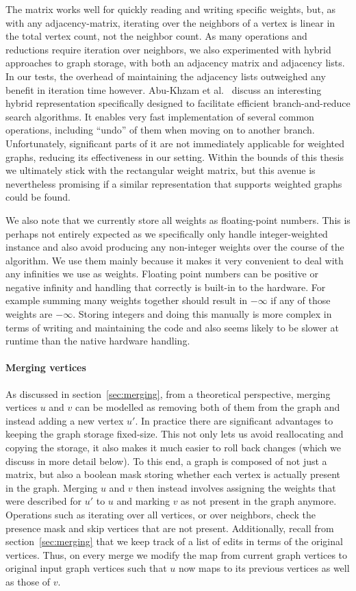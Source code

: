 \documentclass[12pt,oneside,english,parskip=full,headings=small]{scrbook}
\theoremstyle{definition}
\begin{document}
The matrix works well for quickly reading and writing specific weights, but, as with any
adjacency-matrix, iterating over the neighbors of a vertex is linear in the total vertex count, not
the neighbor count. As many operations and reductions require iteration over neighbors, we also
experimented with hybrid approaches to graph storage, with both an adjacency matrix and adjacency
lists. In our tests, the overhead of maintaining the adjacency lists outweighed any benefit in
iteration time however. Abu-Khzam et al.~\cite{AbuKhzam} discuss an interesting hybrid
representation specifically designed to facilitate efficient branch-and-reduce search algorithms. It
enables very fast implementation of several common operations, including ``undo'' of them when
moving on to another branch. Unfortunately, significant parts of it are not immediately applicable
for weighted graphs, reducing its effectiveness in our setting. Within the bounds of this thesis we
ultimately stick with the rectangular weight matrix, but this avenue is nevertheless promising if a
similar representation that supports weighted graphs could be found.

We also note that we currently store all weights as floating-point numbers. This is perhaps not
entirely expected as we specifically only handle integer-weighted instance and also avoid producing
any non-integer weights over the course of the algorithm. We use them mainly because it makes it
very convenient to deal with any infinities we use as weights. Floating point numbers can be
positive or negative infinity and handling that correctly is built-in to the hardware. For example
summing many weights together should result in $-\infty$ if any of those weights are $-\infty$.
Storing integers and doing this manually is more complex in terms of writing and maintaining the
code and also seems likely to be slower at runtime than the native hardware handling.

\paragraph{Merging vertices} As discussed in section~\ref{sec:merging}, from a theoretical
perspective, merging vertices $u$ and $v$ can be modelled as removing both of them from the graph
and instead adding a new vertex $u'$. In practice there are significant advantages to keeping the
graph storage fixed-size. This not only lets us avoid reallocating and copying the storage, it also
makes it much easier to roll back changes (which we discuss in more detail below). To this end, a
graph is composed of not just a matrix, but also a boolean mask storing whether each vertex is
actually present in the graph. Merging $u$ and $v$ then instead involves assigning the weights that
were described for $u'$ to $u$ and marking $v$ as not present in the graph anymore. Operations such
as iterating over all vertices, or over neighbors, check the presence mask and skip vertices that
are not present. Additionally, recall from section~\ref{sec:merging} that we keep track of a list of
edits in terms of the original vertices. Thus, on every merge we modify the map from current graph
vertices to original input graph vertices such that $u$ now maps to its previous vertices as well as
those of $v$.
\end{document}
